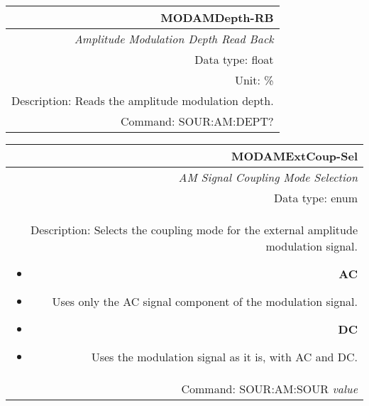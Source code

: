 \documentclass[openany]{article}
\begin{document}
		\begin{tabular}{N}
			\hline
			\bfseries MODAMDepth-RB \\ \hline
			\emph{Amplitude Modulation Depth Read Back} \\
			Data type: float \\
			Unit: \% \\
			Description: Reads the amplitude modulation depth. \\
			Command: SOUR:AM:DEPT? \\

		\end{tabular}
%
		\begin{tabular}{N}
			\hline
			\bfseries MODAMExtCoup-Sel \\ \hline
			\emph{AM Signal Coupling Mode Selection} \\
			Data type: enum \\  
			Description: Selects the coupling mode for the external amplitude modulation signal.\begin{itemize}[noitemsep]
				\small
				\item[] \textbf{AC} 
				\item[]	Uses only the AC signal component of the modulation signal.
				\item[] \textbf{DC}
				\item[] Uses the modulation signal as it is, with AC and DC.
			\end{itemize} \\
			Command: SOUR:AM:SOUR \emph{value} \\

		\end{tabular}
\end{document}
